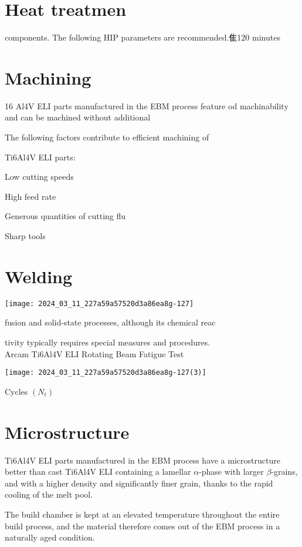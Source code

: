 \documentclass[10pt]{article}
\begin{document}
\section*{Heat treatmen}
 components. The following HIP parameters are recommended.隹120 minutes

\section*{Machining}
16 Al4V ELI parts manufactured in the EBM process feature od machinability and can be machined without additional

The following factors contribute to efficient machining of

Ti6Al4V ELI parts:

Low cutting speeds

High feed rate

Generous quantities of cutting flu

Sharp tools

\section*{Welding}
\begin{center}
\texttt{[image: 2024\_03\_11\_227a59a57520d3a86ea8g-127]}
\end{center}

fusion and solid-state processes, although its chemical reac

tivity typically requires special measures and procedures.\\
Arcam Ti6Al4V ELI Rotating Beam Fatigue Test

\begin{center}
\texttt{[image: 2024\_03\_11\_227a59a57520d3a86ea8g-127(3)]}
\end{center}

Cycles $\left(N_{t}\right)$

\section*{Microstructure}
Ti6Al4V ELI parts manufactured in the EBM process have a microstructure better than cast Ti6Al4V ELI containing a lamellar $\alpha$-phase with larger $\beta$-grains, and with a higher density and significantly finer grain, thanks to the rapid cooling of the melt pool.

The build chamber is kept at an elevated temperature throughout the entire build process, and the material therefore comes out of the EBM process in a naturally aged condition.
\end{document}
